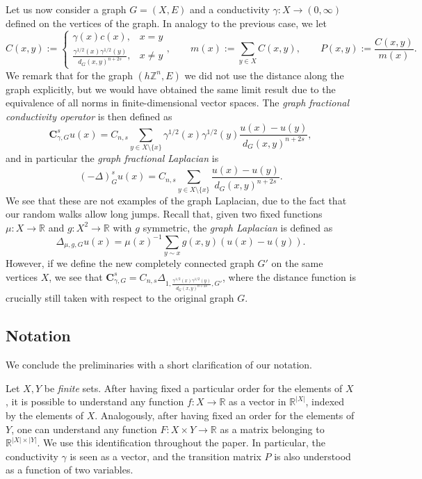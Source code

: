 \documentclass[a4paper,11pt,oneside]{amsart}
\newcommand{\R}{{\mathbb R}}
\newcommand{\Z}{{\mathbb Z}}
\begin{document}
Let us now consider a graph $G=(X,E)$ and a conductivity $\gamma: X\rightarrow (0,\infty)$ defined on the vertices of the graph. In analogy to the previous case, we let
$$ C(x,y):=\begin{cases}
    \gamma(x)c(x), & x=y \\
    \frac{\gamma^{1/2}(x)\gamma^{1/2}(y)}{d_G(x,y)^{n+2s}},  & x\neq y
\end{cases} , \qquad m(x):= \sum_{y\in X}C(x,y), \qquad P(x,y):= \frac{C(x,y)}{m(x)}. $$
We remark that for the graph $(h\Z^n,E)$ we did not use the distance along the graph explicitly, but we would have obtained the same limit result due to the equivalence of all norms in finite-dimensional vector spaces. The \emph{graph fractional conductivity operator} is then defined as
$$ \mathbf C^s_{\gamma,G} u(x) = C_{n,s} \sum_{y\in X\setminus\{x\}} \gamma^{1/2}(x)\gamma^{1/2}(y)\frac{u(x)- u(y)}{d_G(x,y)^{n+2s}}, $$
and in particular the \emph{graph fractional Laplacian} is
$$ (-\Delta)^s_{G} u(x) = C_{n,s} \sum_{y\in X\setminus\{x\}} \frac{u(x)- u(y)}{d_G(x,y)^{n+2s}}. $$
We see that these are not examples of the graph Laplacian, due to the fact that our random walks allow long jumps. Recall that, given two fixed functions $\mu: X\rightarrow \R$ and $g:X^2\rightarrow \R$ with $g$ symmetric, the \emph{graph Laplacian} is defined as  $$\Delta_{\mu,g,G}u(x) = \mu(x)^{-1}\sum_{y\sim x} g(x,y)(u(x)-u(y)).$$ 
However, if we define the new completely connected graph $G'$ on the same vertices $X$, we see that $ \mathbf C^s_{\gamma,G}= C_{n,s}\Delta_{1, \frac{\gamma^{1/2}(x)\gamma^{1/2}(y)}{d_G(x,y)^{n+2s}} ,G'} $, where the distance function is crucially still taken with respect to the original graph $G$.

\subsection{Notation}
We conclude the preliminaries with a short clarification of our notation. 

Let $X,Y$ be \emph{finite} sets. After having fixed a particular order for the elements of $X$, it is possible to understand any function $f: X\rightarrow \R$ as a vector in $\R^{|X|}$, indexed by the elements of $X$. Analogously, after having fixed an order for the elements of $Y$, one can understand any function $F:X\times Y\rightarrow \R$ as a matrix belonging to $\R^{|X|\times |Y|}$. We use this identification throughout the paper. In particular, the conductivity $\gamma$ is seen as a vector, and the transition matrix $P$ is also understood as a function of two variables.  
\end{document}
